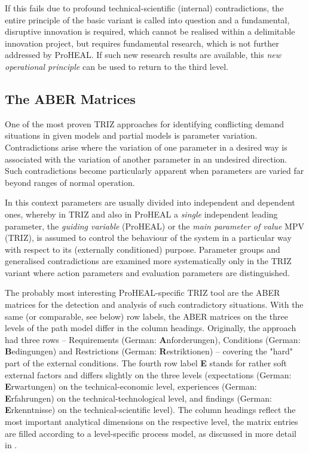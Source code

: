\documentclass[11pt,a4paper]{article}
\begin{document}
If this fails due to profound technical-scientific (internal) contradictions,
the entire principle of the basic variant is called into question and a
fundamental, disruptive innovation is required, which cannot be realised
within a delimitable innovation project, but requires fundamental research,
which is not further addressed by ProHEAL. If such new research results are
available, this \emph{new operational principle} can be used to return to the
third level.

\subsection{The ABER Matrices}

One of the most proven TRIZ approaches for identifying conflicting demand
situations in given models and partial models is parameter variation.
Contradictions arise where the variation of one parameter in a desired way is
associated with the variation of another parameter in an undesired direction.
Such contradictions become particularly apparent when parameters are varied
far beyond ranges of normal operation.

In this context parameters are usually divided into independent and dependent
ones, whereby in TRIZ and also in ProHEAL a \emph{single} independent leading
parameter, the \emph{guiding variable} (ProHEAL) or the \emph{main parameter
  of value} MPV (TRIZ), is assumed to control the behaviour of the system in a
particular way with respect to its (externally conditioned) purpose. Parameter
groups and generalised contradictions are examined more systematically only in
the TRIZ variant where action parameters and evaluation parameters are
distinguished.

The probably most interesting ProHEAL-specific TRIZ tool are the ABER matrices
for the detection and analysis of such contradictory situations. With the same
(or comparable, see below) row labels, the ABER matrices on the three levels
of the path model differ in the column headings. Originally, the approach had
three rows -- Requirements (German: \textbf{A}nforderungen), Conditions
(German: \textbf{B}edingungen) and Restrictions (German:
\textbf{R}estriktionen) -- covering the "hard" part of the external
conditions.  The fourth row label \textbf{E} stands for rather soft external
factors and differs slightly on the three levels (expectations (German:
\textbf{E}rwartungen) on the technical-economic level, experiences (German:
\textbf{E}rfahrungen) on the technical-technological level, and findings
(German: \textbf{E}rkenntnisse) on the technical-scientific level). The column
headings reflect the most important analytical dimensions on the respective
level, the matrix entries are filled according to a level-specific process
model, as discussed in more detail in \cite{ProHEAL-21}.
\end{document}

